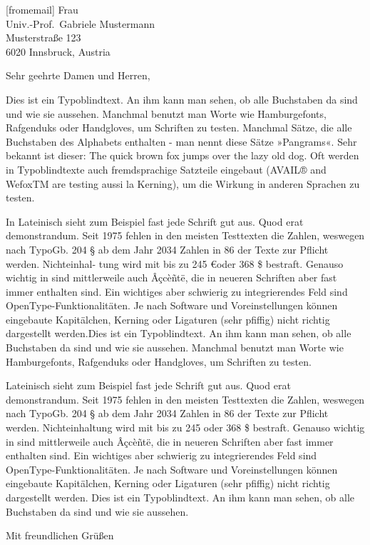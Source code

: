 \documentclass[german,noconfig,
]{uibklttr}
\begin{document}
\begin{letter}[fromemail]{%
  Frau\\
  Univ.-Prof.~Gabriele Mustermann\\
  Musterstraße 123\\
  6020 Innsbruck, Austria}

\opening{Sehr geehrte Damen und Herren,}

Dies ist ein Typoblindtext. An ihm kann man sehen, ob alle Buchstaben da sind
und wie sie aussehen. Manchmal benutzt man Worte wie Hamburgefonts, Rafgenduks
oder Handgloves, um Schriften zu testen. Manchmal Sätze, die alle Buchstaben des
Alphabets enthalten - man nennt diese Sätze »Pangrams«. Sehr bekannt ist dieser:
The quick brown fox jumps over the lazy old dog. Oft werden in Typoblindtexte
auch fremdsprachige Satzteile eingebaut (AVAIL® and WefoxTM are testing aussi la
Kerning), um die Wirkung in anderen Sprachen zu testen.

In Lateinisch sieht zum Beispiel fast jede Schrift gut aus. Quod erat
demonstrandum. Seit 1975 fehlen in den meisten Testtexten die Zahlen, weswegen
nach TypoGb. 204 § ab dem Jahr 2034 Zahlen in 86 der Texte zur Pflicht werden.
Nichteinhal- tung wird mit bis zu 245 €oder 368 \$ bestraft. Genauso wichtig in
sind mittlerweile auch Âçcèñtë, die in neueren Schriften aber fast immer
enthalten sind. Ein wichtiges aber schwierig zu integrierendes Feld sind
OpenType-Funktionalitäten. Je nach Software und Voreinstellungen können
eingebaute Kapitälchen, Kerning oder Ligaturen (sehr pfiffig) nicht richtig
dargestellt werden.Dies ist ein Typoblindtext. An ihm kann man sehen, ob alle
Buchstaben da sind und wie sie aussehen.  Manchmal benutzt man Worte wie
Hamburgefonts, Rafgenduks oder Handgloves, um Schriften zu testen.

Lateinisch sieht zum Beispiel fast jede Schrift gut aus. Quod erat
demonstrandum. Seit 1975 fehlen in den meisten Testtexten die Zahlen, weswegen
nach TypoGb. 204 § ab dem Jahr 2034 Zahlen in 86 der Texte zur Pflicht werden.
Nichteinhaltung wird mit bis zu 245 oder 368 \$ bestraft. Genauso wichtig in
sind mittlerweile auch Âçcèñtë, die in neueren Schriften aber fast immer
enthalten sind. Ein wichtiges aber schwierig zu integrierendes Feld sind
OpenType-Funktionalitäten. Je nach Software und Voreinstellungen können
eingebaute Kapitälchen, Kerning oder Ligaturen (sehr pfiffig) nicht richtig
dargestellt werden. Dies ist ein Typoblindtext. An ihm kann man sehen, ob alle
Buchstaben da sind und wie sie aussehen.

\closing{Mit freundlichen Grüßen}


\end{letter}
\end{document}
